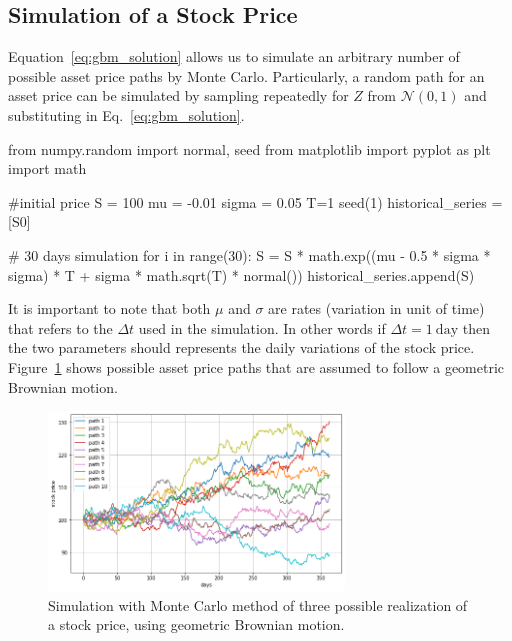 \subsection{Simulation of a Stock Price}

Equation~\ref{eq:gbm_solution} allows us to simulate an arbitrary number of possible asset price paths by Monte Carlo. Particularly, a random path for an asset price can be simulated by sampling repeatedly for $Z$ from $\mathcal{N}(0,1)$ and substituting in Eq.~\ref{eq:gbm_solution}. 

\begin{ipython}
from numpy.random import normal, seed
from matplotlib import pyplot as plt
import math

#initial price
S = 100
mu = -0.01
sigma = 0.05
T=1
seed(1)
historical_series = [S0]

# 30 days simulation
for i in range(30):
    S = S * math.exp((mu - 0.5 * sigma * sigma) * T +
                      sigma * math.sqrt(T) * normal())
    historical_series.append(S)
\end{ipython}

It is important to note that both $\mu$ and $\sigma$ are rates (variation in unit of time) that refers to the $\Delta t$ used in the simulation. In other words if $\Delta t = 1~\textrm{day}$ then the two parameters should represents the daily variations of the stock price. Figure~\ref{fig:stock_price_sim} shows possible asset price paths that are assumed to follow a geometric Brownian motion. 

\begin{figure}[htb]
	\centering
	\includegraphics[width=0.7\textwidth]{figures/asset_price_simulation.png}
	\caption{Simulation with Monte Carlo method of three possible realization of a stock price, using geometric Brownian motion.}
	\label{fig:stock_price_sim}
\end{figure}

